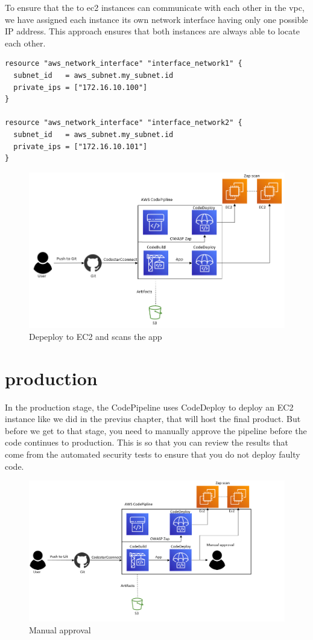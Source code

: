 To ensure that the to \acrshort{ec2} instances can communicate with each other in the \acrshort{vpc}, we have assigned each instance its own network interface having only one possible IP address. This approach ensures that both instances are always able to locate each other.


\begin{tcolorbox}
\begin{verbatim}
resource "aws_network_interface" "interface_network1" {
  subnet_id   = aws_subnet.my_subnet.id
  private_ips = ["172.16.10.100"]
}

resource "aws_network_interface" "interface_network2" {
  subnet_id   = aws_subnet.my_subnet.id
  private_ips = ["172.16.10.101"]
}
\end{verbatim}
\end{tcolorbox}

\vspace{2mm}
\begin{figure}[H]
    \centering
    \includegraphics[width=0.7\columnwidth]{Images/aws-piplin-5.png}
    \caption{Depeploy to EC2 and scans the app}
    \label{fig: Depeploy to EC2 and scans the app}
\end{figure}


\section{production}

In the production stage, the CodePipeline uses CodeDeploy to deploy an EC2 instance like we did in the previus chapter, that will host the final product. But before we get to that stage, you need to manually approve the pipeline before the code continues to production. This is so that you can review the results that come from the automated security tests to ensure that you do not deploy faulty code.
\vspace{2mm}
\begin{figure}[H]
    \centering
    \includegraphics[width=0.8\columnwidth]{Images/aws-piplin-6.png}
    \caption{Manual approval}
    \label{fig: Manual approval}
\end{figure}


